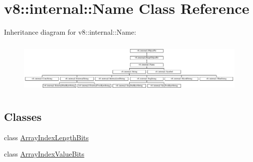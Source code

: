 \hypertarget{classv8_1_1internal_1_1Name}{}\section{v8\+:\+:internal\+:\+:Name Class Reference}
\label{classv8_1_1internal_1_1Name}
Inheritance diagram for v8\+:\+:internal\+:\+:Name\+:\begin{figure}[H]
\begin{center}
\leavevmode
\includegraphics[height=2.592592cm]{classv8_1_1internal_1_1Name}
\end{center}
\end{figure}
\subsection*{Classes}
\begin{DoxyCompactItemize}
\item 
class \mbox{\hyperlink{classv8_1_1internal_1_1Name_1_1ArrayIndexLengthBits}{Array\+Index\+Length\+Bits}}
\item 
class \mbox{\hyperlink{classv8_1_1internal_1_1Name_1_1ArrayIndexValueBits}{Array\+Index\+Value\+Bits}}
\end{DoxyCompactItemize}
